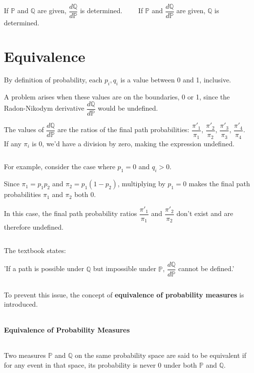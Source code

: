 \documentclass[uplatex,a4j,12pt,dvipdfmx]{jsarticle}
\begin{document}
${}$

If $\mathbb{P}$ and $\mathbb{Q}$ are given, $\dfrac{ d \mathbb{Q} }{ d \mathbb{P} }$ is determined.
\ \ \ \
If $\mathbb{P}$ and $\dfrac{ d \mathbb{Q} }{ d \mathbb{P} }$ are given, $\mathbb{Q}$ is determined.
\ \\
\section{Equivalence}

By definition of probability, each $p_{i}, q_{i}$ is a value between 0 and 1, inclusive.

A problem arises when these values are on the boundaries, 0 or 1, since the Radon-Nikodym derivative $\dfrac{ d \mathbb{Q} }{ d \mathbb{P} }$ would be undefined.

The values of $\dfrac{ d \mathbb{Q} }{ d \mathbb{P} }$ are the ratios of the final path probabilities: $\dfrac{ \pi'_{1} }{ \pi_{1} }$, $\dfrac{ \pi'_{2} }{ \pi_{2} }$, $\dfrac{ \pi'_{3} }{ \pi_{3} }$, $\dfrac{ \pi'_{4} }{ \pi_{4} }$.
If any $\pi_{i}$ is 0, we'd have a division by zero, making the expression undefined.

${}$

For example, consider the case where $p_{1} = 0$ and $q_{i}>0$.

Since $\pi_{1} = p_{1} p_{2}$ and $\pi_{2} = p_{1} (1-p_{2})$, multiplying by $p_{1}=0$ makes the final path probabilities $\pi_{1}$ and $\pi_{2}$ both 0.

In this case, the final path probability ratios $\dfrac{ \pi'_{1} }{ \pi_{1} }$ and $\dfrac{ \pi'_{2} }{ \pi_{2} }$ don't exist and are therefore undefined.

${}$

The textbook \cite{BaxterRennie} states:

'If a path is possible under $\mathbb{Q}$ but impossible under $\mathbb{P}$, $\dfrac{ d \mathbb{Q} }{ d \mathbb{P} }$ cannot be defined.'

${}$

To prevent this issue, the concept of \textbf{equivalence of probability measures} is introduced.

${}$

\paragraph{Equivalence of Probability Measures}

${}$

Two measures $\mathbb{P}$ and $\mathbb{Q}$ on the same probability space are said to be equivalent if for any event in that space, its probability is never 0 under both $\mathbb{P}$ and $\mathbb{Q}$.
\ \\
\end{document}
